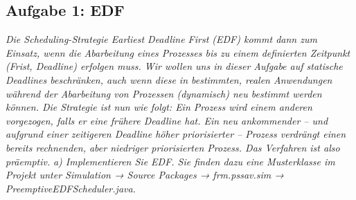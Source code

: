 \documentclass[a4paper]{article}
\begin{document}
\subsection{Aufgabe 1: EDF}
\textit{Die Scheduling-Strategie Earliest Deadline First (EDF) kommt dann zum Einsatz, wenn die Abarbeitung eines Prozesses bis zu einem definierten Zeitpunkt (Frist, Deadline) erfolgen muss. Wir wollen uns in dieser Aufgabe auf statische Deadlines beschränken, auch wenn diese in bestimmten, realen Anwendungen während der Abarbeitung von Prozessen (dynamisch) neu bestimmt werden können.
    Die Strategie ist nun wie folgt: Ein Prozess wird einem anderen vorgezogen, falls er eine frühere Deadline hat. Ein neu ankommender – und aufgrund einer zeitigeren Deadline höher priorisierter – Prozess verdrängt einen bereits rechnenden, aber niedriger priorisierten Prozess. Das Verfahren ist also präemptiv.}
\vspace{10mm}
\textit{a) Implementieren Sie EDF. Sie finden dazu eine Musterklasse im Projekt unter Simulation → Source Packages → frm.pssav.sim → PreemptiveEDFScheduler.java.}
\vspace{10mm}
\end{document}
